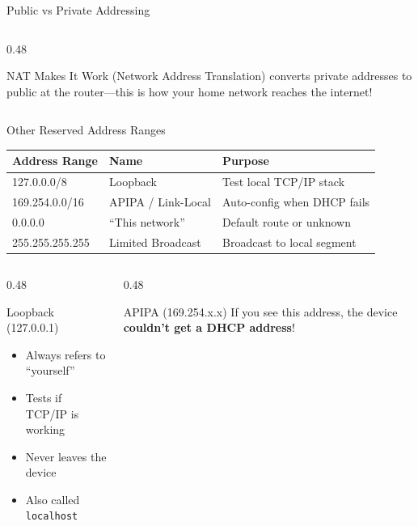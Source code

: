 \documentclass[aspectratio=169]{beamer}  %
\begin{document}
\begin{frame}{Public vs Private Addressing}
\begin{columns}[T]
\begin{column}{0.48\textwidth}
            \vspace{0.3em}
            \begin{exampleblock}{NAT Makes It Work}
                 (Network Address Translation) converts private addresses to public at the router---this is how your home network reaches the internet!
            \end{exampleblock}
        \end{column}
    \end{columns}
\end{frame}

\begin{frame}{Other Reserved Address Ranges}
    \begin{center}
        \begin{tabular}{l l l}
            \toprule
            \textbf{Address Range} & \textbf{Name} & \textbf{Purpose} \\
            \midrule
            \rowcolor{ipblue!15}
            127.0.0.0/8 & Loopback & Test local TCP/IP stack \\
            \rowcolor{aborange!15}
            169.254.0.0/16 & APIPA / Link-Local & Auto-config when DHCP fails \\
            \rowcolor{networkgreen!15}
            0.0.0.0 & ``This network'' & Default route or unknown \\
            \rowcolor{alertred!15}
            255.255.255.255 & Limited Broadcast & Broadcast to local segment \\
            \bottomrule
        \end{tabular}
    \end{center}
    
    \vspace{0.5em}
    \begin{columns}[T]
        \begin{column}{0.48\textwidth}
            \begin{block}{Loopback (127.0.0.1)}
                \begin{itemize}
                    \item Always refers to ``yourself''
                    \item Tests if TCP/IP is working
                    \item Never leaves the device
                    \item Also called \texttt{localhost}
                \end{itemize}
            \end{block}
        \end{column}
        \begin{column}{0.48\textwidth}
            \begin{alertblock}{APIPA (169.254.x.x)}
                If you see this address, the device \textbf{couldn't get a DHCP address}!
                

\end{alertblock}
\end{column}
\end{columns}
\end{frame}
\end{document}
